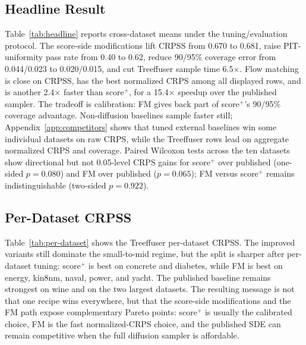 \documentclass{tpm2026}
\begin{document}
\subsection{Headline Result}\label{sec:headline}
Table~\ref{tab:headline} reports cross-dataset means under the tuning/evaluation protocol. The score-side modifications lift CRPSS from 0.670 to 0.681, raise PIT-uniformity pass rate from 0.40 to 0.62, reduce 90/95\% coverage error from 0.044/0.023 to 0.020/0.015, and cut Treeffuser sample time 6.5$\times$. Flow matching is close on CRPSS, has the best normalized CRPS among all displayed rows, and is another 2.4$\times$ faster than score$^+$, for a 15.4$\times$ speedup over the published sampler. The tradeoff is calibration: FM gives back part of score$^+$'s 90/95\% coverage advantage. Non-diffusion baselines sample faster still; Appendix~\ref{app:competitors} shows that tuned external baselines win some individual datasets on raw CRPS, while the Treeffuser rows lead on aggregate normalized CRPS and coverage. Paired Wilcoxon tests across the ten datasets show directional but not 0.05-level CRPS gains for score$^+$ over published (one-sided $p=0.080$) and FM over published ($p=0.065$); FM versus score$^+$ remains indistinguishable (two-sided $p=0.922$).

\subsection{Per-Dataset CRPSS}\label{sec:perdata}
Table~\ref{tab:per-dataset} shows the Treeffuser per-dataset CRPSS. The improved variants still dominate the small-to-mid regime, but the split is sharper after per-dataset tuning: score$^+$ is best on concrete and diabetes, while FM is best on energy, kin8nm, naval, power, and yacht. The published baseline remains strongest on wine and on the two largest datasets. The resulting message is not that one recipe wins everywhere, but that the score-side modifications and the FM path expose complementary Pareto points: score$^+$ is usually the calibrated choice, FM is the fast normalized-CRPS choice, and the published SDE can remain competitive when the full diffusion sampler is affordable.
\end{document}
